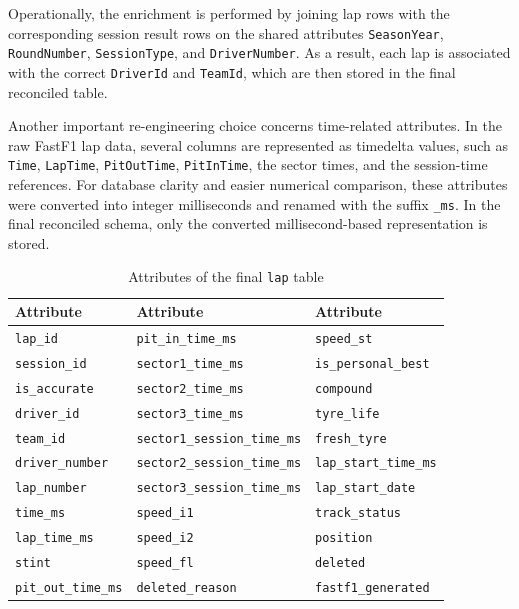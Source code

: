 \documentclass[12pt,a4paper]{article}
\begin{document}
	Operationally, the enrichment is performed by joining lap rows with the corresponding session result rows on the shared attributes \texttt{SeasonYear}, \texttt{RoundNumber}, \texttt{SessionType}, and \texttt{DriverNumber}.
	As a result, each lap is associated with the correct \texttt{DriverId} and \texttt{TeamId}, which are then stored in the final reconciled table.
	
	Another important re-engineering choice concerns time-related attributes.
	In the raw FastF1 lap data, several columns are represented as timedelta values, such as \texttt{Time}, \texttt{LapTime}, \texttt{PitOutTime}, \texttt{PitInTime}, the sector times, and the session-time references.
	For database clarity and easier numerical comparison, these attributes were converted into integer milliseconds and renamed with the suffix \texttt{\_ms}.
	In the final reconciled schema, only the converted millisecond-based representation is stored.

	\begin{table}[H]
		\centering
		\caption{Attributes of the final \texttt{lap} table}
		\renewcommand{\arraystretch}{1.15}
		\begin{tabularx}{\textwidth}{>{\raggedright\arraybackslash}X >{\raggedright\arraybackslash}X >{\raggedright\arraybackslash}X}
			\toprule
			\textbf{Attribute} & \textbf{Attribute} & \textbf{Attribute} \\
			\midrule
			\texttt{lap\_id} & \texttt{pit\_in\_time\_ms} & \texttt{speed\_st} \\
			\texttt{session\_id} & \texttt{sector1\_time\_ms} & \texttt{is\_personal\_best} \\
			\texttt{is\_accurate} & \texttt{sector2\_time\_ms} & \texttt{compound} \\
			\texttt{driver\_id} & \texttt{sector3\_time\_ms} & \texttt{tyre\_life} \\
			\texttt{team\_id} & \texttt{sector1\_session\_time\_ms} & \texttt{fresh\_tyre} \\
			\texttt{driver\_number} & \texttt{sector2\_session\_time\_ms} & \texttt{lap\_start\_time\_ms} \\
			\texttt{lap\_number} & \texttt{sector3\_session\_time\_ms} & \texttt{lap\_start\_date} \\
			\texttt{time\_ms} & \texttt{speed\_i1} & \texttt{track\_status} \\
			\texttt{lap\_time\_ms} & \texttt{speed\_i2} & \texttt{position} \\
			\texttt{stint} & \texttt{speed\_fl} & \texttt{deleted} \\
			\texttt{pit\_out\_time\_ms} & \texttt{deleted\_reason} & \texttt{fastf1\_generated} \\
			\bottomrule
		\end{tabularx}
	\end{table}
	
\end{document}
